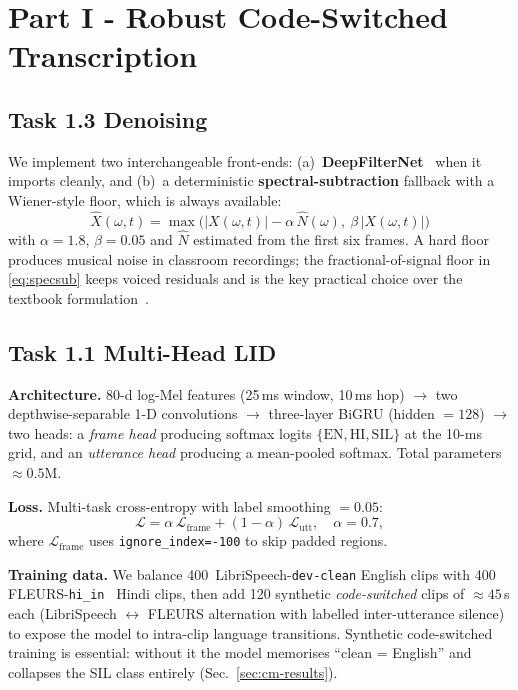 \documentclass[conference]{IEEEtran}
\begin{document}
\section{Part I - Robust Code-Switched Transcription}

\subsection{Task 1.3 Denoising}
We implement two interchangeable front-ends:
(a)~\textbf{DeepFilterNet}~\cite{schroeter2022deepfilternet} when it
imports cleanly, and (b)~a deterministic \textbf{spectral-subtraction}
fallback with a Wiener-style floor, which is always available:
\begin{equation}
\hat{X}(\omega,t) =
\max\!\bigl(\lvert X(\omega,t)\rvert - \alpha \,\widehat{N}(\omega),\ \beta\,\lvert X(\omega,t)\rvert\bigr)
\label{eq:specsub}
\end{equation}
with $\alpha=1.8$, $\beta=0.05$ and $\widehat{N}$ estimated from the
first six frames. A hard floor produces musical noise in classroom
recordings; the fractional-of-signal floor in
\eqref{eq:specsub} keeps voiced residuals and is the key practical
choice over the textbook formulation~\cite{boll1979}.

\subsection{Task 1.1 Multi-Head LID}
\label{sec:lid}
\textbf{Architecture.}
80-d log-Mel features (25\,ms window, 10\,ms hop) $\to$ two
depthwise-separable 1-D convolutions $\to$ three-layer BiGRU (hidden
$=128$) $\to$ two heads: a \textit{frame head} producing softmax
logits $\{\text{EN},\text{HI},\text{SIL}\}$ at the 10-ms grid, and an
\textit{utterance head} producing a mean-pooled softmax. Total
parameters $\approx 0.5$M.

\textbf{Loss.} Multi-task cross-entropy with label smoothing $=0.05$:
\begin{equation}
\mathcal{L} = \alpha\,\mathcal{L}_\text{frame} + (1-\alpha)\,\mathcal{L}_\text{utt},\quad \alpha=0.7,
\end{equation}
where $\mathcal{L}_\text{frame}$ uses
\texttt{ignore\_index=-100} to skip padded regions.

\textbf{Training data.} We balance 400~LibriSpeech-\texttt{dev-clean}
English clips with 400 FLEURS-\texttt{hi\_in}~\cite{conneau2023fleurs}
Hindi clips, then add 120 synthetic \textit{code-switched} clips of
$\approx 45$\,s each (LibriSpeech $\leftrightarrow$ FLEURS
alternation with labelled inter-utterance silence) to expose the
model to intra-clip language transitions. Synthetic code-switched
training is essential: without it the model memorises ``clean =
English'' and collapses the SIL class entirely
(Sec.~\ref{sec:cm-results}).
\end{document}

